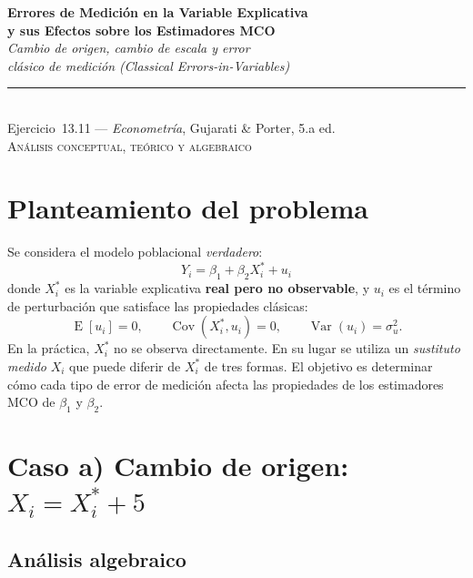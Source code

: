 \documentclass[12pt, letterpaper]{article}
\newcommand{\Cov}{\operatorname{Cov}}
\newcommand{\Var}{\operatorname{Var}}
\newcommand{\E}{\operatorname{E}}
\begin{document}
\begin{center}
  {\LARGE\bfseries Errores de Medición en la Variable Explicativa}\\[6pt]
  {\LARGE\bfseries y sus Efectos sobre los Estimadores MCO}\\[12pt]
  {\large\itshape Cambio de origen, cambio de escala y error}\\
  {\large\itshape clásico de medición (Classical Errors-in-Variables)}\\[14pt]
  \rule{0.55\linewidth}{0.6pt}\\[8pt]
  {\normalsize Ejercicio~13.11 --- \textit{Econometría}, Gujarati \& Porter, 5.a ed.}\\[4pt]
  {\small\textsc{Análisis conceptual, teórico y algebraico}}
\end{center}

\vspace{10pt}

\section{Planteamiento del problema}

Se considera el modelo poblacional \emph{verdadero}:
\begin{equation}
  Y_i = \beta_1 + \beta_2 X_i^* + u_i
  \label{eq:modelo_verdadero}
\end{equation}
donde $X_i^*$ es la variable explicativa \textbf{real pero no observable},
y $u_i$ es el término de perturbación que satisface las propiedades clásicas:
\[
  \E[u_i] = 0, \qquad \Cov(X_i^*, u_i) = 0, \qquad \Var(u_i) = \sigma_u^2.
\]
En la práctica, $X_i^*$ no se observa directamente. En su lugar se utiliza
un \emph{sustituto medido} $X_i$ que puede diferir de $X_i^*$ de tres formas.
El objetivo es determinar cómo cada tipo de error de medición afecta las
propiedades de los estimadores MCO de $\beta_1$ y $\beta_2$.

\section{Caso a) Cambio de origen: $X_i = X_i^* + 5$}

\subsection{Análisis algebraico}
\end{document}
